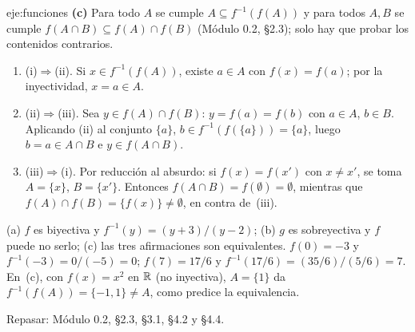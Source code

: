 \begin{solucion}{eje:funciones}
\noindent\textbf{(c)} Para todo $A$ se cumple $A\subseteq f^{-1}(f(A))$ y para todos $A,B$ se cumple $f(A\cap B)\subseteq f(A)\cap f(B)$ (Módulo 0.2, §2.3); solo hay que probar los contenidos contrarios.
\begin{enumerate}[label=\arabic*.]
  \item (i)$\Rightarrow$(ii). Si $x\in f^{-1}(f(A))$, existe $a\in A$ con $f(x)=f(a)$; por la inyectividad, $x=a\in A$.
  \item (ii)$\Rightarrow$(iii). Sea $y\in f(A)\cap f(B)$: $y=f(a)=f(b)$ con $a\in A$, $b\in B$. Aplicando (ii) al conjunto $\{a\}$, $b\in f^{-1}(f(\{a\}))=\{a\}$, luego $b=a\in A\cap B$ e $y\in f(A\cap B)$.
  \item (iii)$\Rightarrow$(i). Por reducción al absurdo: si $f(x)=f(x')$ con $x\neq x'$, se toma $A=\{x\}$, $B=\{x'\}$. Entonces $f(A\cap B)=f(\emptyset)=\emptyset$, mientras que $f(A)\cap f(B)=\{f(x)\}\neq\emptyset$, en contra de~(iii).
\end{enumerate}
\resultado (a) $f$ es biyectiva y $f^{-1}(y)=(y+3)/(y-2)$; (b) $g$ es sobreyectiva y $f$ puede no serlo; (c) las tres afirmaciones son equivalentes.
\comprobacion $f(0)=-3$ y $f^{-1}(-3)=0/(-5)=0$; $f(7)=17/6$ y $f^{-1}(17/6)=(35/6)/(5/6)=7$. En~(c), con $f(x)=x^{2}$ en $\mathbb{R}$ (no inyectiva), $A=\{1\}$ da $f^{-1}(f(A))=\{-1,1\}\neq A$, como predice la equivalencia.


\noindent Repasar: Módulo 0.2, §2.3, §3.1, §4.2 y §4.4.
\end{solucion}

